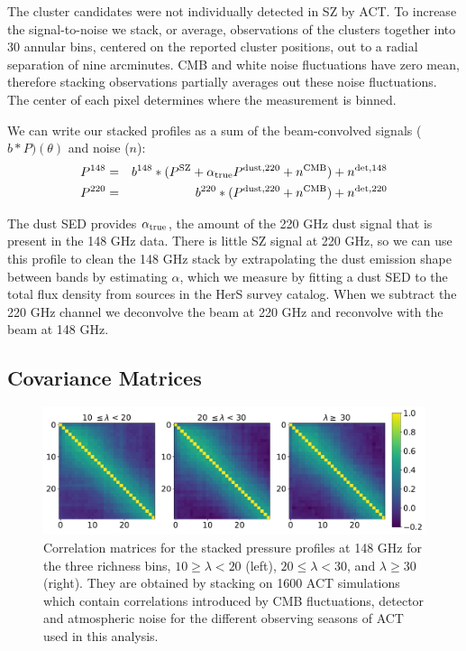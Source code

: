 \documentclass[a4paper,fleqn,usenatbib]{mnras}
\begin{document}
The cluster candidates were not individually detected in SZ by ACT. To increase the signal-to-noise we stack, or average, observations of the clusters together into 30 annular bins, centered on the reported cluster positions, out to a radial separation of nine arcminutes. CMB and white noise fluctuations have zero mean, therefore stacking observations partially averages out these noise fluctuations. The center of each pixel determines where the measurement is binned.

We can write our stacked profiles as a sum of the beam-convolved signals ($b \ast P)(\theta)$ and noise ($n$):
\begin{eqnarray}
  \label{eq:prof148}
  P^{148} &=& b^{148} \ast ( P^{\rm SZ} + \alpha_{\rm true} P^{\rm dust,220} + n^{\rm CMB} ) + n^{\rm det,148}  \\
  \label{eq:prof220}
  P^{220} &=& b^{220} \ast ( P^{\rm dust,220} + n^{\rm CMB} ) + n^{\rm det,220}
\end{eqnarray}

The dust SED provides $\alpha_{\rm true}$, the amount of the 220 GHz dust signal that is present in the 148 GHz data.
There is little SZ signal at 220 GHz, so we can use this profile to clean the 148 GHz stack by extrapolating the dust emission shape between bands by estimating $\alpha$, which we measure by fitting a dust SED to the total flux density from sources in the HerS survey catalog. When we subtract the 220 GHz channel we deconvolve the beam at 220 GHz and reconvolve with the beam at 148 GHz.

\subsection{Covariance Matrices}

\begin{figure}
\centering
  \includegraphics[width=1.75\columnwidth]{correlation_1600_coadd_act_actpol_148_tophat_zbin01_all.pdf}
  \caption{Correlation matrices for the stacked pressure profiles at 148 GHz for the three richness bins, $10 \geq \lambda < 20$ (left), $20 \leq \lambda < 30$, and $\lambda \geq 30$ (right). They are obtained by stacking on 1600 ACT simulations which contain correlations introduced by CMB fluctuations, detector and atmospheric noise for the different observing seasons of ACT used in this analysis.}
  \label{fig:covariance}
\end{figure}
\end{document}
